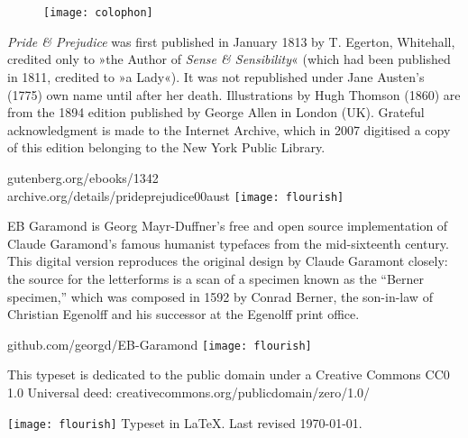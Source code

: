\documentclass[
paper=5.5in:8.5in,
]{scrbook}
\begin{document}


\renewcommand*{\chapterheadendvskip}{\vfill}
\renewcommand*{\chapterheadstartvskip}{\vfill}

\chapter*{}

\centering

\begin{figure}[t!]
\centering
\texttt{[image: colophon]}
\end{figure}
\vfill
\begin{minipage}{\textwidth}
\textit{Pride \& Prejudice} was first published in January 1813 by T. Egerton, Whitehall, credited only to »the Author of \textit{Sense \& Sensibility}« (which had been published in 1811, credited to »a Lady«). It was not republished under Jane Austen's (1775) own name until after her death. Illustrations by Hugh Thomson (1860) are from the 1894 edition published by George Allen in London (UK). Grateful acknowledgment is made to the Internet Archive, which in 2007 digitised a copy of this edition belonging to the New York Public Library.
\end{minipage}
\vfill
gutenberg.org/ebooks/1342\\archive.org/details/prideprejudice00aust
\vfill
\texttt{[image: flourish]}
\vfill
\begin{minipage}{\textwidth}
EB Garamond is Georg Mayr-Duffner's free and open source implementation of Claude Garamond’s famous humanist typefaces from the mid-sixteenth century. This digital version reproduces the original design by Claude Garamont closely: the source for the letterforms is a scan of a specimen known as the \enquote{Berner specimen,} which was composed in 1592 by Conrad Berner, the son-in-law of Christian Egenolff and his successor at the Egenolff print office.
\end{minipage}
\vfill
github.com/georgd/EB-Garamond
\vfill
\texttt{[image: flourish]}
\vfill
\begin{minipage}{\textwidth}
This typeset is dedicated to the public domain under a Creative Commons CC0 1.0 Universal deed: creativecommons.org/publicdomain/zero/1.0/\\
\end{minipage}
\vfill
\texttt{[image: flourish]}
\vfill
Typeset in \LaTeX{}. Last revised \today.
\thispagestyle{empty}
\end{document}
